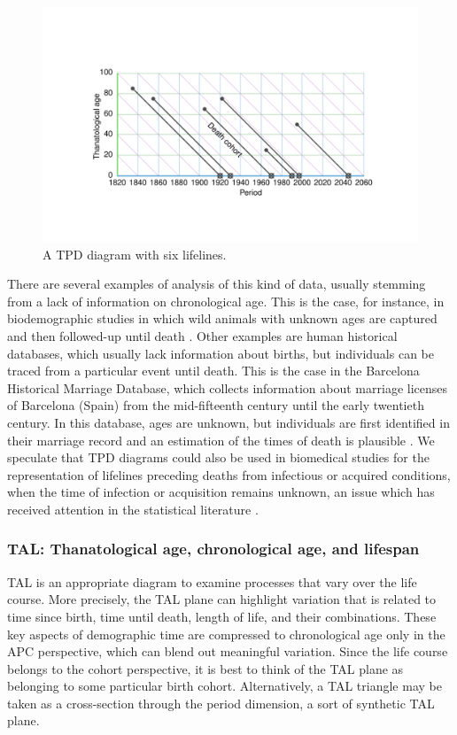 \documentclass[12pt,oneside,a4paper,doublespacing]{article} %
\theoremstyle{definition}
\begin{document}
\begin{figure}[h!] 
\caption{A TPD diagram with six lifelines.}
\label{fig:TPD}
\centering
\vspace{-5em}
\includegraphics[scale=0.8]{Figures/TPDrt.pdf}
\end{figure} 
There are several examples of analysis of this kind of data, usually stemming
from a lack of information on chronological age. This is the case, for instance,
in biodemographic studies in which wild animals with unknown ages are captured
and then followed-up until death \citep{muller2004demographic,
muller2007survival}. Other examples are human historical databases, which
usually lack information about births, but individuals can be traced from a
particular event until death. This is the case in the Barcelona Historical
Marriage Database, which collects information about marriage licenses of
Barcelona (Spain) from the mid-fifteenth century until the early twentieth
century. In this database, ages are unknown, but individuals are first
identified in their marriage record and an estimation of the times of death is
plausible \citep{villavicencio2015reconstructing}. We speculate that TPD
diagrams could also be used in biomedical studies for the representation of
lifelines preceding deaths from infectious or acquired conditions, when the time
of infection or acquisition remains unknown, an issue which has received
attention in the statistical literature \citep[see e.g.][]{chan2010backward}.

\FloatBarrier
\subsubsection{TAL: Thanatological age, chronological age, and
lifespan}
\label{sec:tal}
\FloatBarrier  
TAL is an appropriate diagram to examine processes that vary over the
life course.
More precisely, the TAL plane can highlight variation that is related to time
since birth, time until death, length of life, and their combinations. These
key aspects of demographic time are compressed to chronological age only in the
APC perspective, which can blend out meaningful variation. Since the life course
belongs to the cohort perspective, it is best to think of the TAL plane as belonging to some particular birth cohort. Alternatively, a TAL triangle may be taken as a cross-section through the period dimension, a sort of synthetic TAL plane.
\end{document}
